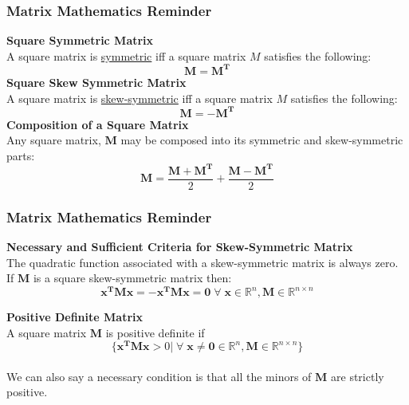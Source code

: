\documentclass[11pt,handout]{beamer}   %
\begin{document}
\begin{frame}
\frametitle{Matrix Mathematics Reminder}
\small
\textbf{Square Symmetric Matrix}\\
A square matrix is \underline{symmetric} iff a square matrix $M$ satisfies the following:\\
\begin{equation*}
\mathbf{M} = \mathbf{M^T}
\end{equation*}
\textbf{Square Skew Symmetric Matrix}\\
A square matrix is \underline{skew-symmetric} iff a square matrix $M$ satisfies the following:\\
\begin{equation*}
\mathbf{M} = -\mathbf{M^T}
\end{equation*}
\textbf{Composition of a Square Matrix}\\
Any square matrix, $\mathbf{M}$ may be composed into its symmetric and skew-symmetric parts:
\begin{equation*}
\mathbf{M} = \frac{\mathbf{M}+\mathbf{M^T}}{2} + \frac{\mathbf{M} - \mathbf{M^T}}{2}
\end{equation*}
\end{frame}

\begin{frame}
\frametitle{Matrix Mathematics Reminder}
\small
\textbf{Necessary and Sufficient Criteria for Skew-Symmetric Matrix}\\
The quadratic function associated with a skew-symmetric matrix is always zero. If $\mathbf{M}$ is a square skew-symmetric matrix then:
\begin{equation*}
\mathbf{x^TMx} = \mathbf{-x^TMx} = \mathbf{0} \; \forall \; \mathbf{x} \in \mathbb{R}^n , \mathbf{M} \in \mathbb{R}^{n \times n}
\end{equation*}
\vspace{6pt}

\textbf{Positive Definite Matrix}\\
A square matrix $\mathbf{M}$ is positive definite if
\begin{equation*}
\lbrace \mathbf{x^TMx} > 0 | \; \forall \; \mathbf{x \neq 0} \in \mathbb{R}^n , \mathbf{M} \in \mathbb{R}^{n \times n} \rbrace
\end{equation*}\\
We can also say a necessary condition is that all the minors of $\mathbf{M}$ are strictly positive.
\vspace{6pt}
\end{frame}
\end{document}
